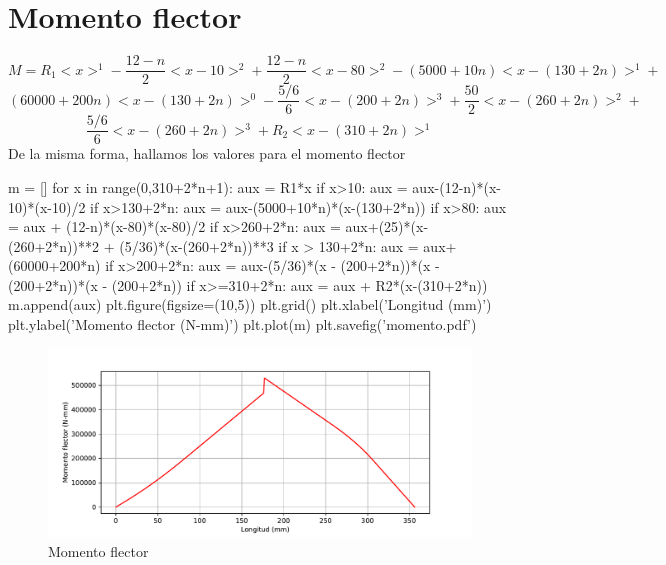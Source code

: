 \documentclass[a4paper,11pt]{report}
\begin{document}
\chapter*{Momento flector}
$$
M = R_{1} <x>^{1} - \frac{12-n}{2}<x-10>^{2} + \frac{12-n}{2}<x-80>^{2} - (5000+10n)<x-(130+2n)>^{1} +$$
$$(60000+200n)<x-(130+2n)>^{0} - \frac{5/6}{6}<x-(200+2n)>^{3} + \frac{50}{2}<x-(260+2n)>^{2} + $$
$$ \frac{5/6}{6}<x-(260+2n)>^{3} + R_{2}<x-(310+2n)>^{1}
$$
De la misma forma, hallamos los valores para el momento flector
\begin{pyglist}[language=python,caption={Cálculo del momento flector},style=tango]
m = []
for x in range(0,310+2*n+1):
    aux = R1*x
    if x>10:
        aux = aux-(12-n)*(x-10)*(x-10)/2
    if x>130+2*n:
        aux = aux-(5000+10*n)*(x-(130+2*n))
    if x>80:
        aux = aux + (12-n)*(x-80)*(x-80)/2
    if x>260+2*n:
        aux = aux+(25)*(x-(260+2*n))**2 + (5/36)*(x-(260+2*n))**3
    if x > 130+2*n:
        aux = aux+(60000+200*n)
    if x>200+2*n:
        aux = aux-(5/36)*(x - (200+2*n))*(x - (200+2*n))*(x - (200+2*n))
    if x>=310+2*n:
        aux = aux + R2*(x-(310+2*n))
    m.append(aux)
plt.figure(figsize=(10,5))
plt.grid()
plt.xlabel('Longitud (mm)')
plt.ylabel('Momento flector (N-mm)')
plt.plot(m)
plt.savefig('momento.pdf')
\end{pyglist}
\begin{figure}[H]
\centering
\includegraphics[scale=0.72]{momento.pdf}
\caption{Momento flector}
\end{figure}
\end{document}
